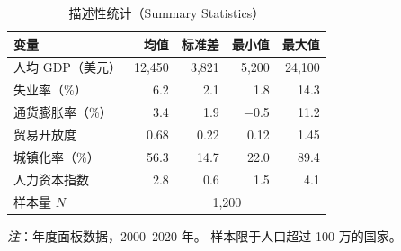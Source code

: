 \begin{table}
  \centering
  \caption{描述性统计（Summary Statistics）}
  {\small
  \begin{tabular}{lrrrr}
    \toprule
    变量 & 均值 & 标准差 & 最小值 & 最大值 \\
    \midrule
    人均 GDP（美元）       & 12{,}450 & 3{,}821 & 5{,}200  & 24{,}100 \\
    失业率（\%）           &     6.2  &    2.1  &     1.8  &     14.3 \\
    通货膨胀率（\%）       &     3.4  &    1.9  &  $-$0.5  &     11.2 \\
    贸易开放度             &    0.68  &   0.22  &    0.12  &      1.45 \\
    城镇化率（\%）         &    56.3  &   14.7  &    22.0  &     89.4 \\
    人力资本指数           &     2.8  &    0.6  &     1.5  &      4.1 \\
    \midrule
    样本量 $N$             & \multicolumn{4}{c}{1{,}200} \\
    \bottomrule
  \end{tabular}}
  \par\smallskip
  \raggedright
  {\footnotesize \textit{注}：年度面板数据，2000--2020 年。
  样本限于人口超过 100 万的国家。}
\end{table}
